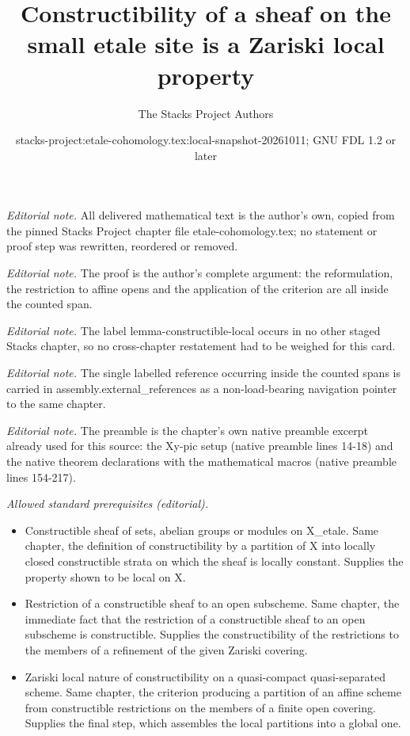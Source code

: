 \documentclass[10pt,a4paper]{amsart}
\title{Constructibility of a sheaf on the small etale site is a Zariski local property}
\author{The Stacks Project Authors}
\date{stacks-project:etale-cohomology.tex:local-snapshot-20261011; GNU FDL 1.2 or later}
\theoremstyle{plain}
\theoremstyle{definition}
\theoremstyle{remark}
\numberwithin{equation}{subsection}
\begin{document}
\maketitle
\noindent\textit{Editorial note.} All delivered mathematical text is the author's own, copied from the pinned Stacks Project chapter file etale-cohomology.tex; no statement or proof step was rewritten, reordered or removed.\par\medskip
\noindent\textit{Editorial note.} The proof is the author's complete argument: the reformulation, the restriction to affine opens and the application of the criterion are all inside the counted span.\par\medskip
\noindent\textit{Editorial note.} The label lemma-constructible-local occurs in no other staged Stacks chapter, so no cross-chapter restatement had to be weighed for this card.\par\medskip
\noindent\textit{Editorial note.} The single labelled reference occurring inside the counted spans is carried in assembly.external\_references as a non-load-bearing navigation pointer to the same chapter.\par\medskip
\noindent\textit{Editorial note.} The preamble is the chapter's own native preamble excerpt already used for this source: the Xy-pic setup (native preamble lines 14-18) and the native theorem declarations with the mathematical macros (native preamble lines 154-217).\par\medskip
\noindent\textit{Allowed standard prerequisites (editorial).}\begin{itemize}
\item Constructible sheaf of sets, abelian groups or modules on X\_etale. Same chapter, the definition of constructibility by a partition of X into locally closed constructible strata on which the sheaf is locally constant. Supplies the property shown to be local on X.
\item Restriction of a constructible sheaf to an open subscheme. Same chapter, the immediate fact that the restriction of a constructible sheaf to an open subscheme is constructible. Supplies the constructibility of the restrictions to the members of a refinement of the given Zariski covering.
\item Zariski local nature of constructibility on a quasi-compact quasi-separated scheme. Same chapter, the criterion producing a partition of an affine scheme from constructible restrictions on the members of a finite open covering. Supplies the final step, which assembles the local partitions into a global one.
\end{itemize}\medskip
\end{document}
